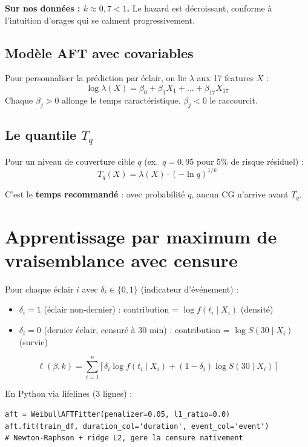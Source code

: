 \documentclass[11pt,a4paper]{article}
\begin{document}
\textbf{Sur nos données : $k \approx 0{,}7 < 1$.} Le hazard est décroissant, conforme à
l'intuition d'orages qui se calment progressivement.

\subsection{Modèle AFT avec covariables}

Pour personnaliser la prédiction par éclair, on lie $\lambda$ aux 17 features $X$ :
\[
\log \lambda(X) = \beta_0 + \beta_1 X_1 + \dots + \beta_{17} X_{17}
\]
Chaque $\beta_j > 0$ allonge le temps caractéristique. $\beta_j < 0$ le raccourcit.

\subsection{Le quantile $T_q$}

Pour un niveau de couverture cible $q$ (ex.\ $q=0{,}95$ pour 5\% de risque résiduel) :
\[
T_q(X) = \lambda(X) \cdot (-\ln q)^{1/k}
\]

C'est le \textbf{temps recommandé} : avec probabilité $q$, aucun CG n'arrive avant $T_q$.

\section{Apprentissage par maximum de vraisemblance avec censure}

\begin{tcolorbox}[colback=blue!5,colframe=blue!50!black,title=\textbf{Log-vraisemblance avec censure}]
Pour chaque éclair $i$ avec $\delta_i \in \{0, 1\}$ (indicateur d'événement) :
\begin{itemize}[topsep=2pt]
    \item $\delta_i = 1$ (éclair non-dernier) : contribution = $\log f(t_i \mid X_i)$ (densité)
    \item $\delta_i = 0$ (dernier éclair, censuré à 30 min) : contribution = $\log S(30 \mid X_i)$ (survie)
\end{itemize}

\[
\ell(\beta, k) = \sum_{i=1}^{n} \big[\,\delta_i \log f(t_i \mid X_i) + (1-\delta_i) \log S(30 \mid X_i)\,\big]
\]
\end{tcolorbox}

En Python via lifelines (3 lignes) :

\begin{lstlisting}[caption={Fit du Weibull AFT.}]
aft = WeibullAFTFitter(penalizer=0.05, l1_ratio=0.0)
aft.fit(train_df, duration_col='duration', event_col='event')
# Newton-Raphson + ridge L2, gere la censure nativement
\end{lstlisting}
\end{document}
